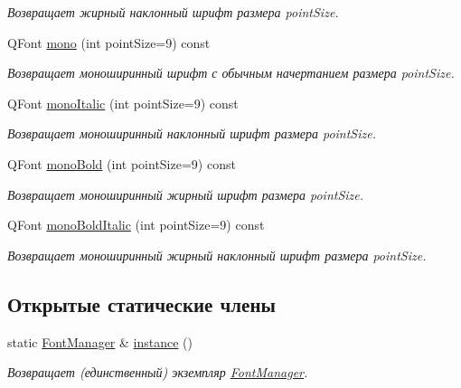 \begin{DoxyCompactItemize}
\begin{DoxyCompactList}\small\item\em Возвращает жирный наклонный шрифт размера point\+Size. \end{DoxyCompactList}\item 
\hypertarget{class_font_manager_a74afe4af0bcda4414bde7f998f04e224}{}\label{class_font_manager_a74afe4af0bcda4414bde7f998f04e224} 
Q\+Font \hyperlink{class_font_manager_a74afe4af0bcda4414bde7f998f04e224}{mono} (int point\+Size=9) const
\begin{DoxyCompactList}\small\item\em Возвращает моноширинный шрифт с обычным начертанием размера point\+Size. \end{DoxyCompactList}\item 
\hypertarget{class_font_manager_a1c25f1d035d56c68043135e4a33c4f3b}{}\label{class_font_manager_a1c25f1d035d56c68043135e4a33c4f3b} 
Q\+Font \hyperlink{class_font_manager_a1c25f1d035d56c68043135e4a33c4f3b}{mono\+Italic} (int point\+Size=9) const
\begin{DoxyCompactList}\small\item\em Возвращает моноширинный наклонный шрифт размера point\+Size. \end{DoxyCompactList}\item 
\hypertarget{class_font_manager_a5c4adeae1d91707c24cd211f5d645e57}{}\label{class_font_manager_a5c4adeae1d91707c24cd211f5d645e57} 
Q\+Font \hyperlink{class_font_manager_a5c4adeae1d91707c24cd211f5d645e57}{mono\+Bold} (int point\+Size=9) const
\begin{DoxyCompactList}\small\item\em Возвращает моноширинный жирный шрифт размера point\+Size. \end{DoxyCompactList}\item 
\hypertarget{class_font_manager_ae43b72d3ea68690e635dd33100064ce8}{}\label{class_font_manager_ae43b72d3ea68690e635dd33100064ce8} 
Q\+Font \hyperlink{class_font_manager_ae43b72d3ea68690e635dd33100064ce8}{mono\+Bold\+Italic} (int point\+Size=9) const
\begin{DoxyCompactList}\small\item\em Возвращает моноширинный жирный наклонный шрифт размера point\+Size. \end{DoxyCompactList}\end{DoxyCompactItemize}
\subsection*{Открытые статические члены}
\begin{DoxyCompactItemize}
\item 
\hypertarget{class_font_manager_a53cd643c23b4c4bc18a0461e18f2291f}{}\label{class_font_manager_a53cd643c23b4c4bc18a0461e18f2291f} 
static \hyperlink{class_font_manager}{Font\+Manager} \& \hyperlink{class_font_manager_a53cd643c23b4c4bc18a0461e18f2291f}{instance} ()
\begin{DoxyCompactList}\small\item\em Возвращает (единственный) экземпляр \hyperlink{class_font_manager}{Font\+Manager}. \end{DoxyCompactList}\end{DoxyCompactItemize}
